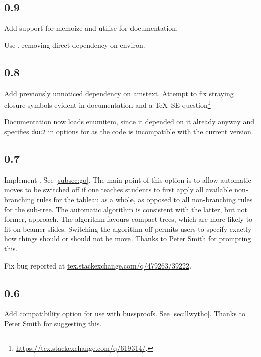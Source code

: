 \documentclass[10pt,british,a4paper,doc2]{ltxdoc}
\newcommand*\pkg[1]{\textsf{#1}}
\begin{document}
\subsection{0.9}\label{subsec:0.9}
Add support for \pkg{memoize} and utilise for documentation.

Use , removing direct dependency on \pkg{environ}.

\subsection{0.8}
Add previously unnoticed dependency on \pkg{amstext}.
Attempt to fix straying closure symbols evident in documentation and a \TeX\ SE question\footnote{\url{https://tex.stackexchange.com/q/619314/}.}

Documentation now loads \pkg{enumitem}, since it depended on it already anyway and specifies \verb|doc2| in options for  as the code is incompatible with the current version.

\subsection{0.7}\label{subsec:v0.7}


Implement .
See \cref{subsec:go}.
The main point of this option is to allow automatic moves to be switched off if one teaches students to first apply  all available non-branching rules for the tableau as a whole, as opposed to all non-branching rules for the sub-tree.
The automatic algorithm is consistent with the latter, but not former, approach.
The algorithm favours compact trees, which are more likely to fit on \pkg{beamer} slides.
Switching the algorithm off permits users to specify exactly how things should or should not be move.
Thanks to Peter Smith for prompting this.

Fix bug reported at \href{https://tex.stackexchange.com/q/479263/39222}{tex.stackexchange.com/q/479263/39222}.


\subsection{0.6}\label{subsec:v0.6}


Add compatibility option for use with \pkg{bussproofs}.
See \cref{sec:llwytho}.
Thanks to Peter Smith for suggesting this.
\end{document}
